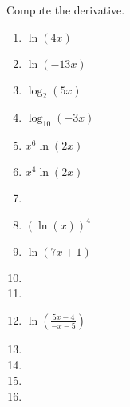 Compute the derivative. 

\begin{multicols}{2}
\begin{enumerate}[ref={\fcProblemRef}]
\item $\displaystyle \ln(4x)$

\item $\displaystyle \ln(-13 x)$

\item  $\displaystyle\log_2(5 x)$

\item  $\displaystyle\log_{10}(-3 x)$

\item  $\displaystyle x^6\ln(2x)$

\item $\displaystyle x^{4} \ln\left(2 x\right)$

\item  
\item $\displaystyle (\ln{}\left({{x}}\right))^{4} $

\item $\displaystyle \ln{}\left(7 {{x}}+1\right)$

\item 
\item 
\item $\displaystyle \ln{}\left(\frac{5 {{x}}-4}{- {{x}}-5}\right) $


\item 
\item 
\item 
\item 
\end{enumerate}
\end{multicols}